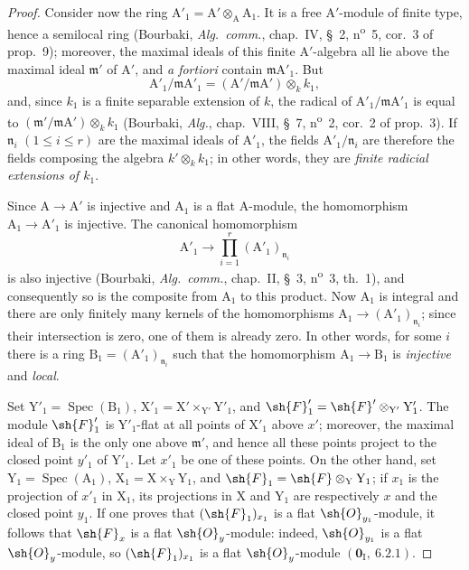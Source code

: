 \begin{proof}
Consider now the ring $\mathrm{A}'_1=\mathrm{A}'\otimes_\mathrm{A}\mathrm{A}_1$.
It is a free $\mathrm{A}'$-module of finite type, hence a semilocal ring (Bourbaki, \emph{Alg.\ comm.}, chap.~IV, \S~2, n\textsuperscript{o}~5, cor.~3 of prop.~9); moreover, the maximal ideals of this finite $\mathrm{A}'$-algebra all lie above the maximal ideal $\mathfrak{m}'$ of $\mathrm{A}'$, and \emph{a fortiori} contain $\mathfrak{m}\mathrm{A}'_1$.
But
\[
\mathrm{A}'_1/\mathfrak{m}\mathrm{A}'_1=(\mathrm{A}'/\mathfrak{m}\mathrm{A}')\otimes_k k_1,
\]
and, since $k_1$ is a finite separable extension of $k$, the radical of $\mathrm{A}'_1/\mathfrak{m}\mathrm{A}'_1$ is equal to $(\mathfrak{m}'/\mathfrak{m}\mathrm{A}')\otimes_k k_1$ (Bourbaki, \emph{Alg.}, chap.~VIII, \S~7, n\textsuperscript{o}~2, cor.~2 of prop.~3).
If $\mathfrak{n}_i$ $(1\leq i\leq r)$ are the maximal ideals of $\mathrm{A}'_1$, the fields $\mathrm{A}'_1/\mathfrak{n}_i$ are therefore the fields composing the algebra $k'\otimes_k k_1$; in other words, they are \emph{finite radicial extensions of $k_1$}.

Since $\mathrm{A}\to\mathrm{A}'$ is injective and $\mathrm{A}_1$ is a flat $\mathrm{A}$-module, the homomorphism $\mathrm{A}_1\to\mathrm{A}'_1$ is injective.
The canonical homomorphism
\[
\mathrm{A}'_1\longrightarrow\prod_{i=1}^{r}(\mathrm{A}'_1)_{\mathfrak{n}_i}
\]
is also injective (Bourbaki, \emph{Alg.\ comm.}, chap.~II, \S~3, n\textsuperscript{o}~3, th.~1), and consequently so is the composite from $\mathrm{A}_1$ to this product.
Now $\mathrm{A}_1$ is integral and there are only finitely many kernels of the homomorphisms $\mathrm{A}_1\to(\mathrm{A}'_1)_{\mathfrak{n}_i}$; since their intersection is zero, one of them is already zero.
In other words, for some $i$ there is a ring $\mathrm{B}_1=(\mathrm{A}'_1)_{\mathfrak{n}_i}$ such that the homomorphism $\mathrm{A}_1\to\mathrm{B}_1$ is \emph{injective} and \emph{local}.

Set $\mathrm{Y}'_1=\operatorname{Spec}(\mathrm{B}_1)$, $\mathrm{X}'_1=\mathrm{X}'\times_{\mathrm{Y}'}\mathrm{Y}'_1$, and $\sh{F}'_1=\sh{F}'\otimes_{\mathrm{Y}'}\mathrm{Y}'_1$.
The module $\sh{F}'_1$ is $\mathrm{Y}'_1$-flat at all points of $\mathrm{X}'_1$ above $x'$; moreover, the maximal ideal of $\mathrm{B}_1$ is the only one above $\mathfrak{m}'$, and hence all these points project to the closed point $y'_1$ of $\mathrm{Y}'_1$.
Let $x'_1$ be one of these points.
On the other hand, set $\mathrm{Y}_1=\operatorname{Spec}(\mathrm{A}_1)$, $\mathrm{X}_1=\mathrm{X}\times_\mathrm{Y}\mathrm{Y}_1$, and $\sh{F}_1=\sh{F}\otimes_\mathrm{Y}\mathrm{Y}_1$; if $x_1$ is the projection of $x'_1$ in $\mathrm{X}_1$, its projections in $\mathrm{X}$ and $\mathrm{Y}_1$ are respectively $x$ and the closed point $y_1$.
If one proves that $(\sh{F}_1)_{x_1}$ is a flat $\sh{O}_{y_1}$-module, it follows that $\sh{F}_x$ is a flat $\sh{O}_y$-module: indeed, $\sh{O}_{y_1}$ is a flat $\sh{O}_y$-module, so $(\sh{F}_1)_{x_1}$ is a flat $\sh{O}_y$-module $(\mathbf{0}_\mathrm{I},~6.2.1)$.


\end{proof}
